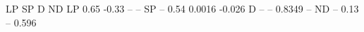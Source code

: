 \begin{Schunk}
\begin{Soutput}
     LP    SP      D     ND
LP 0.65 -0.33     --     --
SP   --  0.54 0.0016 -0.026
D    --    -- 0.8349     --
ND   --  0.13     --  0.596
\end{Soutput}
\end{Schunk}
